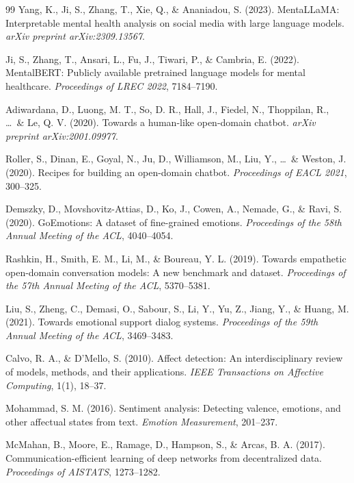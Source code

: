 \documentclass[12pt,twoside]{article}
\begin{document}
\begin{thebibliography}{99}
Yang, K., Ji, S., Zhang, T., Xie, Q., \& Ananiadou, S. (2023). MentaLLaMA: Interpretable mental health analysis on social media with large language models. \textit{arXiv preprint arXiv:2309.13567}.

Ji, S., Zhang, T., Ansari, L., Fu, J., Tiwari, P., \& Cambria, E. (2022). MentalBERT: Publicly available pretrained language models for mental healthcare. \textit{Proceedings of LREC 2022}, 7184--7190.

Adiwardana, D., Luong, M. T., So, D. R., Hall, J., Fiedel, N., Thoppilan, R., \ldots\ \& Le, Q. V. (2020). Towards a human-like open-domain chatbot. \textit{arXiv preprint arXiv:2001.09977}.

Roller, S., Dinan, E., Goyal, N., Ju, D., Williamson, M., Liu, Y., \ldots\ \& Weston, J. (2020). Recipes for building an open-domain chatbot. \textit{Proceedings of EACL 2021}, 300--325.


Demszky, D., Movshovitz-Attias, D., Ko, J., Cowen, A., Nemade, G., \& Ravi, S. (2020). GoEmotions: A dataset of fine-grained emotions. \textit{Proceedings of the 58th Annual Meeting of the ACL}, 4040--4054.

Rashkin, H., Smith, E. M., Li, M., \& Boureau, Y. L. (2019). Towards empathetic open-domain conversation models: A new benchmark and dataset. \textit{Proceedings of the 57th Annual Meeting of the ACL}, 5370--5381.

Liu, S., Zheng, C., Demasi, O., Sabour, S., Li, Y., Yu, Z., Jiang, Y., \& Huang, M. (2021). Towards emotional support dialog systems. \textit{Proceedings of the 59th Annual Meeting of the ACL}, 3469--3483.

Calvo, R. A., \& D'Mello, S. (2010). Affect detection: An interdisciplinary review of models, methods, and their applications. \textit{IEEE Transactions on Affective Computing}, 1(1), 18--37.

Mohammad, S. M. (2016). Sentiment analysis: Detecting valence, emotions, and other affectual states from text. \textit{Emotion Measurement}, 201--237.


McMahan, B., Moore, E., Ramage, D., Hampson, S., \& Arcas, B. A. (2017). Communication-efficient learning of deep networks from decentralized data. \textit{Proceedings of AISTATS}, 1273--1282.


\end{thebibliography}
\end{document}
